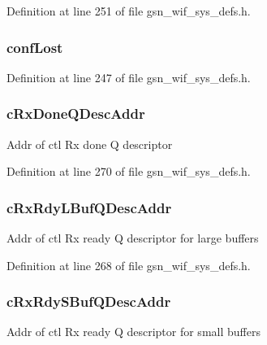Definition at line 251 of file gsn\_\-wif\_\-sys\_\-defs.h.

\hypertarget{a00348_ad81cf810d5479c72eb00a2dae02d1bfb}{
\subsubsection[{confLost}]{ {\bf confLost}}}
\label{a00348_ad81cf810d5479c72eb00a2dae02d1bfb}


Definition at line 247 of file gsn\_\-wif\_\-sys\_\-defs.h.

\hypertarget{a00348_aa5ee884cd0421e255598f366d7725088}{
\subsubsection[{cRxDoneQDescAddr}]{ {\bf cRxDoneQDescAddr}}}
\label{a00348_aa5ee884cd0421e255598f366d7725088}
Addr of ctl Rx done Q descriptor 

Definition at line 270 of file gsn\_\-wif\_\-sys\_\-defs.h.

\hypertarget{a00348_a8abf8636a4f60a8f51ea8857ade542d5}{
\subsubsection[{cRxRdyLBufQDescAddr}]{ {\bf cRxRdyLBufQDescAddr}}}
\label{a00348_a8abf8636a4f60a8f51ea8857ade542d5}
Addr of ctl Rx ready Q descriptor for large buffers 

Definition at line 268 of file gsn\_\-wif\_\-sys\_\-defs.h.

\hypertarget{a00348_a4c1ebbd82b71958696f47604eb581d7c}{
\subsubsection[{cRxRdySBufQDescAddr}]{ {\bf cRxRdySBufQDescAddr}}}
\label{a00348_a4c1ebbd82b71958696f47604eb581d7c}
Addr of ctl Rx ready Q descriptor for small buffers 

